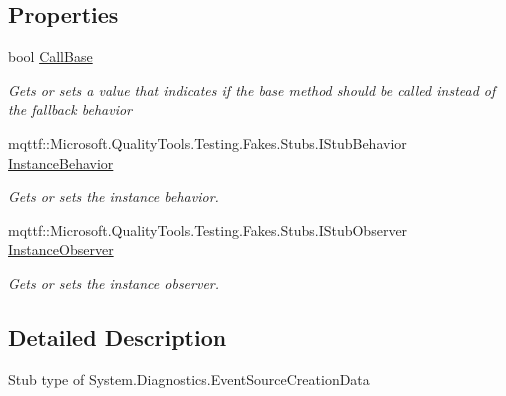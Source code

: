 \subsection*{Properties}
\begin{DoxyCompactItemize}
\item 
bool \hyperlink{class_system_1_1_diagnostics_1_1_fakes_1_1_stub_event_source_creation_data_afc89fb340cd44b102cd40bc9570923c9}{Call\-Base}
\begin{DoxyCompactList}\small\item\em Gets or sets a value that indicates if the base method should be called instead of the fallback behavior\end{DoxyCompactList}\item 
mqttf\-::\-Microsoft.\-Quality\-Tools.\-Testing.\-Fakes.\-Stubs.\-I\-Stub\-Behavior \hyperlink{class_system_1_1_diagnostics_1_1_fakes_1_1_stub_event_source_creation_data_ae07d514ac61c8953604d50860017bc9e}{Instance\-Behavior}
\begin{DoxyCompactList}\small\item\em Gets or sets the instance behavior.\end{DoxyCompactList}\item 
mqttf\-::\-Microsoft.\-Quality\-Tools.\-Testing.\-Fakes.\-Stubs.\-I\-Stub\-Observer \hyperlink{class_system_1_1_diagnostics_1_1_fakes_1_1_stub_event_source_creation_data_a37dd1f8fe9d58d60c8bbe444b2d23822}{Instance\-Observer}
\begin{DoxyCompactList}\small\item\em Gets or sets the instance observer.\end{DoxyCompactList}\end{DoxyCompactItemize}


\subsection{Detailed Description}
Stub type of System.\-Diagnostics.\-Event\-Source\-Creation\-Data



